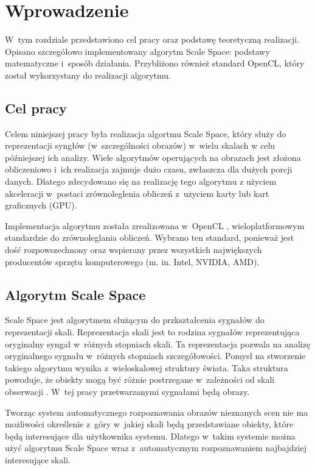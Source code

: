 \chapter{Wprowadzenie}
\label{cha:wprowadzenie}

W~tym rozdziale przedstawiono cel pracy oraz podstawę teoretyczną realizacji. Opisano szczegółowo implementowany algorytm Scale Space: podstawy matematyczne i~sposób działania. Przybliżono również standard OpenCL, który został wykorzystany do realizacji algorytmu.


\section{Cel pracy}
\label{sec:cel}
Celem niniejszej pracy była realizacja algortmu Scale Space, który służy do reprezentacji syngłów (w~szczególności obrazów) w~wielu skalach w celu późniejszej ich analizy.
Wiele algorytmów operujących na obrazach jest złożona obliczeniowo i~ich realizacja zajmuje dużo czasu, zwłaszcza dla dużych porcji danych. Dlatego zdecydowano się na realizację tego algorytmu z użyciem akceleracji w~postaci zrównoleglenia obliczeń z~użyciem karty lub kart graficznych (GPU).

Implementacja algorytmu została zrealizowana w~OpenCL \cite{OpenCL}, wieloplatformowym standardzie do zrównoleglania obliczeń. Wybrano ten standard, ponieważ jest dość rozpowszechnony oraz wspierany przez wszystkich największych producentów sprzętu komputerowego (m. in. Intel\textsuperscript{\textregistered}, NVIDIA\textsuperscript{\texttrademark}, AMD).

\section{Algorytm Scale Space}
\label{sec:algorytm}
Scale Space jest algorytmem służącym do przkształcenia sygnałów do reprezentacji skali. Reprezentacja skali jest to rodzina sygnałów reprezentująca oryginalny syngał w~różnych stopniach skali.
Ta reprezentacja pozwala na analizę oryginalnego sygnału w~różnych stopniach szczegółowości.
Pomysł na stworzenie takiego algorytmu wynika z~wieloskalowej struktury świata. Taka struktura powoduje, że obiekty mogą być różnie postrzegane w~zależności od skali obserwacji \cite{Enc09}.
W~tej pracy przetwarzanymi sygnałami będą obrazy.

Tworząc system automatycznego rozpoznawania obrazów nieznanych scen nie ma możliwości określenie z~góry w~jakiej skali będą przedstawiane obiekty, które będą interesujące dla użytkownika systemu. Dlatego w~takim systemie można użyć algorytmu Scale Space wraz z~automatycznym rozpoznawaniem najbajdziej interesujące skali.



